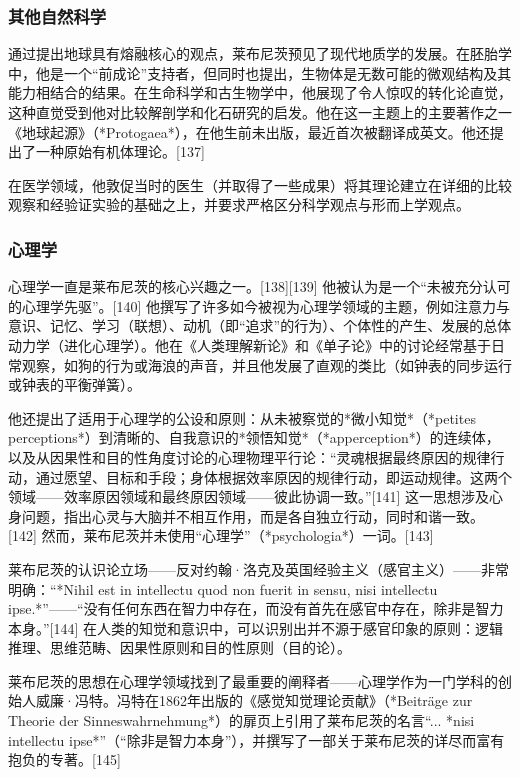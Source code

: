 \subsubsection{其他自然科学}
通过提出地球具有熔融核心的观点，莱布尼茨预见了现代地质学的发展。在胚胎学中，他是一个“前成论”支持者，但同时也提出，生物体是无数可能的微观结构及其能力相结合的结果。在生命科学和古生物学中，他展现了令人惊叹的转化论直觉，这种直觉受到他对比较解剖学和化石研究的启发。他在这一主题上的主要著作之一《地球起源》（*Protogaea*），在他生前未出版，最近首次被翻译成英文。他还提出了一种原始有机体理论。[137]  

在医学领域，他敦促当时的医生（并取得了一些成果）将其理论建立在详细的比较观察和经验证实验的基础之上，并要求严格区分科学观点与形而上学观点。
\subsubsection{心理学}
心理学一直是莱布尼茨的核心兴趣之一。[138][139] 他被认为是一个“未被充分认可的心理学先驱”。[140] 他撰写了许多如今被视为心理学领域的主题，例如注意力与意识、记忆、学习（联想）、动机（即“追求”的行为）、个体性的产生、发展的总体动力学（进化心理学）。他在《人类理解新论》和《单子论》中的讨论经常基于日常观察，如狗的行为或海浪的声音，并且他发展了直观的类比（如钟表的同步运行或钟表的平衡弹簧）。  

他还提出了适用于心理学的公设和原则：从未被察觉的*微小知觉*（*petites perceptions*）到清晰的、自我意识的*领悟知觉*（*apperception*）的连续体，以及从因果性和目的性角度讨论的心理物理平行论：“灵魂根据最终原因的规律行动，通过愿望、目标和手段；身体根据效率原因的规律行动，即运动规律。这两个领域——效率原因领域和最终原因领域——彼此协调一致。”[141] 这一思想涉及心身问题，指出心灵与大脑并不相互作用，而是各自独立行动，同时和谐一致。[142] 然而，莱布尼茨并未使用“心理学”（*psychologia*）一词。[143]  

莱布尼茨的认识论立场——反对约翰·洛克及英国经验主义（感官主义）——非常明确：“*Nihil est in intellectu quod non fuerit in sensu, nisi intellectu ipse.*”——“没有任何东西在智力中存在，而没有首先在感官中存在，除非是智力本身。”[144] 在人类的知觉和意识中，可以识别出并不源于感官印象的原则：逻辑推理、思维范畴、因果性原则和目的性原则（目的论）。

莱布尼茨的思想在心理学领域找到了最重要的阐释者——心理学作为一门学科的创始人威廉·冯特。冯特在1862年出版的《感觉知觉理论贡献》（*Beiträge zur Theorie der Sinneswahrnehmung*）的扉页上引用了莱布尼茨的名言“... *nisi intellectu ipse*”（“除非是智力本身”），并撰写了一部关于莱布尼茨的详尽而富有抱负的专著。[145]  

